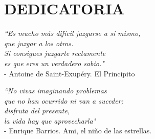 \chapter*{DEDICATORIA}

\vspace{2cm}

\begin{flushright}
    \textit{
        “Es mucho más difícil juzgarse a sí mismo,\\
        que juzgar a los otros.\\
        Si consigues juzgarte rectamente \\
        es que eres un verdadero sabio."\\
    }
    - Antoine de Saint-Exupéry. El Principito \\
    \vspace{2cm}

    \textit{“No vivas imaginando problemas \\
        que no han ocurrido ni van a suceder; \\
        disfruta del presente, \\
        la vida hay que aprovecharla"\\
    }
    - Enrique Barrios. Ami, el niño de las estrellas.

\end{flushright}
